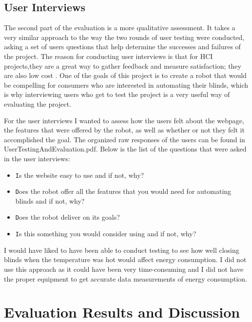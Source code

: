 \documentclass[10pt,twocolumn]{article}
\begin{document}
\subsection{User Interviews}
The second part of the evaluation is a more qualitative assessment. It takes a very similar approach to the way the two rounds of user testing were conducted, asking a set of users questions that help determine the successes and failures of the project. The reason for conducting user interviews is that for HCI projects,they are a great way to gather feedback and measure satisfaction; they are also low cost \cite{Muller2015Designing}. One of the goals of this project is to create a robot that would be compelling for consumers who are interested in automating their blinds, which is why interviewing users who get to test the project is a very useful way of evaluating the project. 

For the user interviews I wanted to assess how the users felt about the webpage, the features that were offered by the robot, as well as whether or not they felt it accomplished the goal. The organized raw responses of the users can be found in UserTestingAndEvaluation.pdf. Below is the list of the questions that were asked in the user interviews:

\begin{itemize}
    \item \texttt Is the website easy to use and if not, why?
    \item \texttt Does the robot offer all the features that you would need for automating blinds and if not, why?
    \item \texttt Does the robot deliver on its goals?
    \item \texttt Is this something you would consider using and if not, why?
\end{itemize}

I would have liked to have been able to conduct testing to see how well closing blinds when the temperature was hot would affect energy consumption. I did not use this approach as it could have been very time-consuming and I did not have the proper equipment to get accurate data measurements of energy consumption.

\section{Evaluation Results and Discussion}
\end{document}
